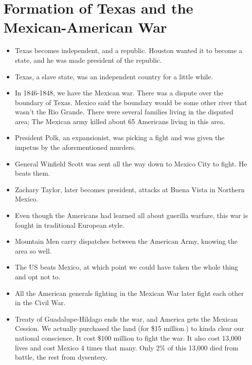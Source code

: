 \documentclass{article}
\begin{document}
\section{Formation of Texas and the Mexican-American War}
  \begin{itemize}
    \item Texas becomes independent, and a republic. Houston wanted it to become a state, and he was made president of the republic.
    \item Texas, a slave state, was an independent country for a little while.
    \item In 1846-1848, we have the Mexican war. There was a dispute over the boundary of Texas. Mexico said the boundary would be some other river that wasn't the Rio Grande. There were several families living in the disputed area; The Mexican army killed about 65 Americans living in this area.
    \item President Polk, an expansionist, was picking a fight and was given the impetus by the aforementioned murders.
    \item General Winfield Scott was sent all the way down to Mexico City to fight. He beats them.
    \item Zachary Taylor, later becomes president, attacks at Buena Vista in Northern Mexico.
    \item Even though the Americans had learned all about guerilla warfare, this war is fought in traditional European style.
    \item Mountain Men carry dispatches between the American Army, knowing the area so well.
    \item The US beats Mexico, at which point we could have taken the whole thing and opt not to.
    \item All the American generals fighting in the Mexican War later fight each other in the Civil War.
    \item Treaty of Guadalupe-Hildago ends the war, and America gets the Mexican Cession. We actually purchased the land (for \$15 million.) to kinda clear our national conscience. It cost \$100 million to fight the war. It also cost 13,000 lives and cost Mexico 4 times that many. Only 2\% of this 13,000 died from battle, the rest from dysentery.
  \end{itemize}
\end{document}

